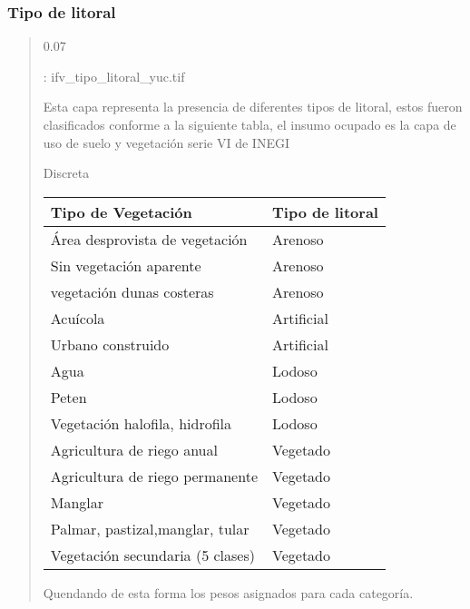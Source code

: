 \documentclass[letterpaper,10pt,spanish]{sphinxmanual}
\begin{document}
\subsubsection{Tipo de litoral}
\label{\detokenize{sensibilidad:tipo-de-litoral}}
\begin{quote}

 0.07

: ifv\_tipo\_litoral\_yuc.tif

 Esta capa representa la presencia de diferentes tipos de litoral, estos fueron clasificados
conforme a la siguiente tabla, el insumo ocupado es la capa de uso de suelo y vegetación
serie VI de INEGI

 Discreta


\begin{savenotes}\sphinxattablestart
\centering
\begin{tabulary}{\linewidth}[t]{|T|T|}
\hline
\sphinxstyletheadfamily 
Tipo de Vegetación
&\sphinxstyletheadfamily 
Tipo de litoral
\\
\hline
Área desprovista de vegetación
&
Arenoso
\\
\hline
Sin vegetación aparente
&
Arenoso
\\
\hline
vegetación dunas costeras
&
Arenoso
\\
\hline
Acuícola
&
Artificial
\\
\hline
Urbano construido
&
Artificial
\\
\hline
Agua
&
Lodoso
\\
\hline
Peten
&
Lodoso
\\
\hline
Vegetación halofila, hidrofila
&
Lodoso
\\
\hline
Agricultura de riego anual
&
Vegetado
\\
\hline
Agricultura de riego permanente
&
Vegetado
\\
\hline
Manglar
&
Vegetado
\\
\hline
Palmar, pastizal,manglar, tular
&
Vegetado
\\
\hline
Vegetación secundaria (5 clases)
&
Vegetado
\\
\hline
\end{tabulary}
\par
\sphinxattableend\end{savenotes}

Quendando de esta forma los pesos asignados para cada categoría.



\end{quote}
\end{document}
